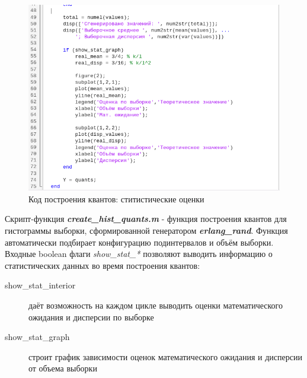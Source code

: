 \documentclass[12pt]{article}
\begin{document}
 \begin{figure}[!h]
	\centering
	\includegraphics[width=\linewidth]{hists_code_2.png}
	\caption{Код построения квантов: ститистические оценки}
\end{figure}

Скрипт-функция \textbf{\textit{create\_hist\_quants.m}} - функция построения квантов для гистограммы выборки, сформированной генератором \textbf{\textit{erlang\_rand}}. Функция автоматически подбирает конфигурацию подинтервалов и объём выборки.\\

Входные boolean флаги \textit{show\_stat\_*} позволяют выводить информацию о статистических данных во время построения квантов:
\begin{description}
	\item [show\_stat\_interior] даёт возможность на каждом цикле выводить оценки математического ожидания и дисперсии по выборке
	\item [show\_stat\_graph] строит график зависимости оценок математического ожидания и дисперсии от объема выборки\\
\end{description}
\end{document}
